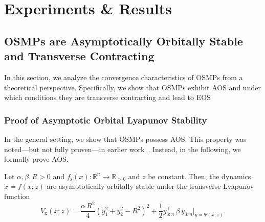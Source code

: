 \section{Experiments \& Results}\label{sec:osmp:results}
\subsection{OSMPs are Asymptotically Orbitally Stable and Transverse Contracting}
In this section, we analyze the convergence characteristics of \glspl{OSMP} from a theoretical perspective. Specifically, we show that \glspl{OSMP} exhibit \gls{AOS} and under which conditions they are transverse contracting and lead to \gls{EOS}

\subsubsection{Proof of Asymptotic Orbital Lyapunov Stability}
In the general setting, we show that \glspl{OSMP} possess \gls{AOS}. This property was noted—but not fully proven—in earlier work~\citep{urain2020imitationflow,zhi2024teaching}. Instead, in the following, we formally prove \gls{AOS}.
\begin{theorem}\label{theorem:osmp:asymptotic_orbital_stability}
    Let $\alpha, \beta, R > 0$ and $f_\mathrm{s}(x): \mathbb{R}^n \to \mathbb{R}_{>0}$ and $z$ be constant. Then, the dynamics $\dot{x} = f(x;z)$ are asymptotically orbitally stable under the transverse Lyapunov function
    \begin{equation}
        V_\mathrm{x}(x;z) = \frac{\alpha \, R^2}{4} \left ( y_1^2+y_2^2 - R^2 \right )^2 + \frac{1}{2} y_{3:n}^\top \, \beta \, y_{3:n} \Bigg |_{y=\Psi(x;z)}.
    \end{equation}
\end{theorem}
